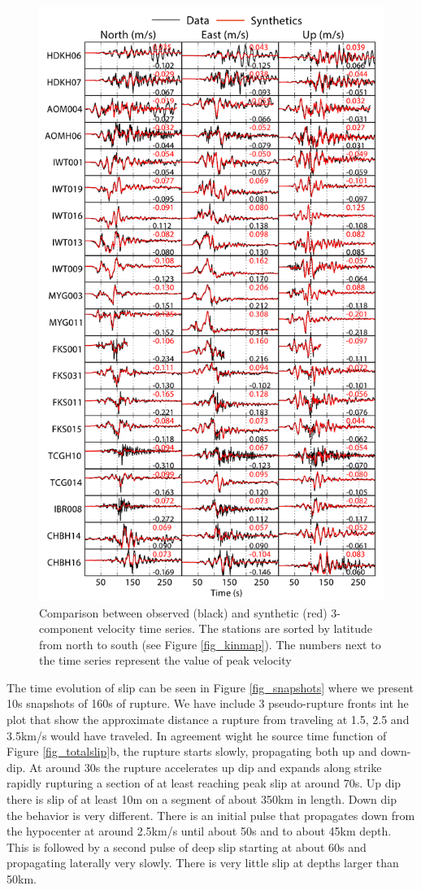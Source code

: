 \begin{figure}[!ht] 
  \centering
  \includegraphics[width=0.75\linewidth]{./figures/ch4/vel_data_vs_synthetics}
    \caption[Data fits No. 2 for the kinematic inversion]{Comparison between observed (black) and synthetic (red) 3-component velocity time series. The stations are sorted by latitude from north to south (see Figure \ref{fig_kinmap}). The numbers next to the time series represent the value of peak velocity}
  \label{fig_velfits}
\end{figure}

The time evolution of slip can be seen in Figure \ref{fig_snapshots} where we present 10s snapshots of 160s of rupture. We have include 3 pseudo-rupture fronts int he plot that show the approximate distance a rupture from traveling at 1.5, 2.5 and 3.5km/s would have traveled. In agreement wight he source time function of Figure \ref{fig_totalslip}b, the rupture starts slowly, propagating both up and down-dip. At around 30s the rupture accelerates up dip and expands along strike rapidly rupturing a section of at least reaching peak slip at around 70s. Up dip there is slip of at least 10m on a segment of about 350km in length. Down dip the behavior is very different. There is an initial pulse that propagates down from the hypocenter at around 2.5km/s until about 50s and to about 45km depth. This is followed by a second pulse of deep slip starting at about 60s and propagating laterally very slowly. There is very little slip at depths larger than 50km.

